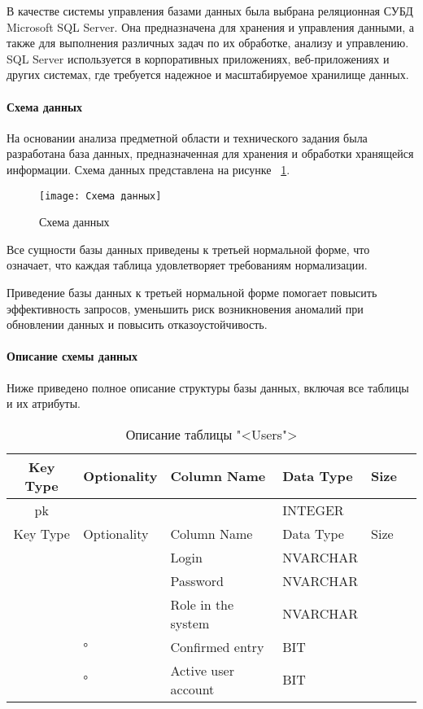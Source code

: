 В качестве системы управления базами данных была выбрана реляционная СУБД Microsoft SQL Server. Она предназначена для хранения и управления данными, а также для выполнения различных задач по их обработке, анализу и управлению. SQL Server используется в корпоративных приложениях, веб-приложениях и других системах, где требуется надежное и масштабируемое хранилище данных.

\paragraph{Схема данных}

На основании анализа предметной области и технического задания была разработана база данных, предназначенная для хранения и обработки хранящейся информации. Схема данных представлена на рисунке ~\ref{templ:image1}.
\begin{figure}[H]
	\texttt{[image: Схема данных]}
	\caption{Схема данных}
	\label{templ:image1}
\end{figure}

Все сущности базы данных приведены к третьей нормальной форме, что означает, что каждая таблица удовлетворяет требованиям нормализации.

Приведение базы данных к третьей нормальной форме помогает повысить эффективность запросов, уменьшить риск возникновения аномалий при обновлении данных и повысить отказоустойчивость.

\paragraph{Описание схемы данных}

Ниже приведено полное описание структуры базы данных, включая все таблицы и их атрибуты.

\begin{xltabular}{\textwidth}{|c|X|X|X|X|X|}
	\caption{Описание таблицы "<Users">\label{prod:table1}}\\ \hline
	\centrow Key Type & \centrow Optionality & \centrow Column Name & \centrow Data Type & \centrow Size \\ \hline
	\centrow pk & \centrow * &  & \centrow INTEGER & \\ \hline
	\endfirsthead
	\centrow Key Type & \centrow Optionality & \centrow Column Name & \centrow Data Type & \centrow Size \\ \hline
	\finishhead
	& \centrow * & \centrow Login & \centrow NVARCHAR &  \\ \hline 
	& \centrow * & \centrow Password & \centrow NVARCHAR &  \\ \hline
	& \centrow * & \centrow Role in the system & \centrow NVARCHAR &  \\ \hline 
	& \centrow ° & \centrow Confirmed entry & \centrow BIT & \centrow  \\ \hline 
	& \centrow ° & \centrow Active user account & \centrow BIT & \centrow  \\ \hline 
\end{xltabular}

